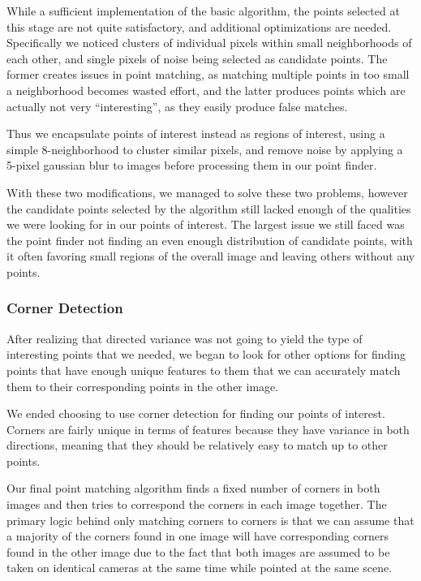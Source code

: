While a sufficient implementation of the basic algorithm, the points selected at this stage are not quite satisfactory, and additional optimizations are needed. Specifically we noticed clusters of individual pixels within small neighborhoods of each other, and single pixels of noise being selected as candidate points. The former creates issues in point matching, as matching multiple points in too small a neighborhood becomes wasted effort, and the latter produces points which are actually not very ``interesting'', as they easily produce false matches.

Thus we encapsulate points of interest instead as regions of interest, using a simple 8-neighborhood to cluster similar pixels, and remove noise by applying a 5-pixel gaussian blur to images before processing them in our point finder.

With these two modifications, we managed to solve these two problems, however the candidate points selected by the algorithm still lacked enough of the qualities we were looking for in our points of interest. The largest issue we still faced was the point finder not finding an even enough distribution of candidate points, with it often favoring small regions of the overall image and leaving others without any points.

\subsubsection{Corner Detection}
After realizing that directed variance was not going to yield the type of interesting points that we needed, we began to look for other options for finding points that have enough unique features to them that we can accurately match them to their corresponding points in the other image. 

We ended choosing to use corner detection for finding our points of interest. Corners are fairly unique in terms of features because they have variance in both directions, meaning that they should be relatively easy to match up to other points. 

Our final point matching algorithm finds a fixed number of corners in both images and then tries to correspond the corners in each image together. The primary logic behind only matching corners to corners is that we can assume that a majority of the corners found in one image will have corresponding corners found in the other image due to the fact that both images are assumed to be taken on identical cameras at the same time while pointed at the same scene.

